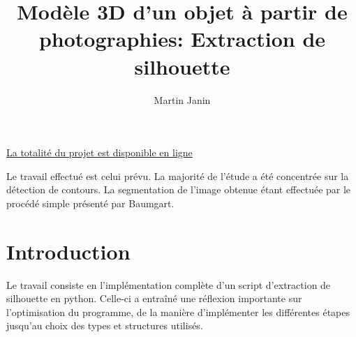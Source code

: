 \documentclass{article}
\author{Martin Janin}
\title{Modèle 3D d'un objet à partir de photographies: Extraction de silhouette}
\begin{document}
\maketitle

\centerline{\href{https://github.com/Involture/fuuusion}{La totalité du projet est disponible en ligne}}

\bigskip
\bigskip

Le travail effectué est celui prévu. La majorité de l'étude a été concentrée sur la détection de contours. La segmentation de l'image obtenue étant effectuée par le procédé simple présenté par Baumgart.

\noindent\makebox[\linewidth]{\rule{\textwidth}{0.4pt}}
\vspace{-0.8cm}
\tableofcontents
\noindent\makebox[\linewidth]{\rule{\textwidth}{0.4pt}}

\bigskip
\bigskip

\section{Introduction}

Le travail consiste en l'implémentation complète d'un script d'extraction de silhouette en python. Celle-ci a entraîné une réflexion importante sur l'optimisation du programme, de la manière d'implémenter les différentes étapes jusqu'au choix des types et structures utilisés.

\pagebreak
\end{document}

